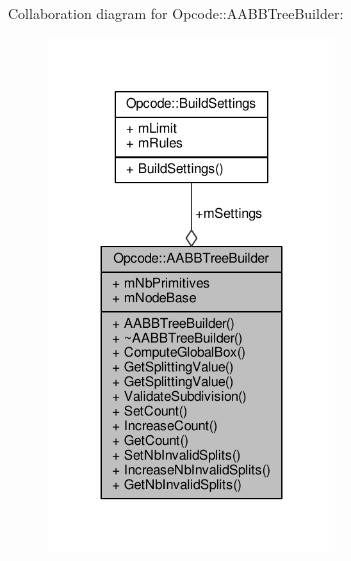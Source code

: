 Collaboration diagram for Opcode\+:\+:A\+A\+B\+B\+Tree\+Builder\+:
\nopagebreak
\begin{figure}[H]
\begin{center}
\leavevmode
\includegraphics[width=215pt]{d9/d2b/classOpcode_1_1AABBTreeBuilder__coll__graph}
\end{center}
\end{figure}
